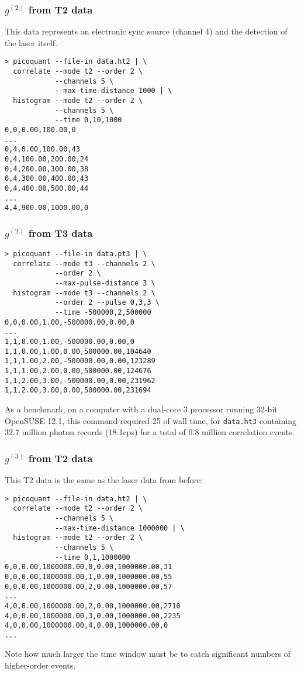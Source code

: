 \documentclass{article}
\newcommand{\cps}{\textnormal{cps}}
\newcommand{\gn}[1]{\ensuremath{g^{(#1)}}}
\begin{document}
\subsubsection{\gn{2} from T2 data}
This data represents an electronic sync source (channel 4) and the detection of the laser itself.
\begin{verbatim}
> picoquant --file-in data.ht2 | \
  correlate --mode t2 --order 2 \
            --channels 5 \
            --max-time-distance 1000 | \
  histogram --mode t2 --order 2 \
            --channels 5 \
            --time 0,10,1000
0,0,0.00,100.00,0
...
0,4,0.00,100.00,43
0,4,100.00,200.00,24
0,4,200.00,300.00,38
0,4,300.00,400.00,43
0,4,400.00,500.00,44
...
4,4,900.00,1000.00,0
\end{verbatim}

\subsubsection{\gn{2} from T3 data}
\begin{verbatim}
> picoquant --file-in data.pt3 | \
  correlate --mode t3 --channels 2 \
            --order 2 \
            --max-pulse-distance 3 \
  histogram --mode t3 --channels 2 \
            --order 2 --pulse 0,3,3 \
            --time -500000,2,500000
0,0,0.00,1.00,-500000.00,0.00,0
...
1,1,0.00,1.00,-500000.00,0.00,0
1,1,0.00,1.00,0.00,500000.00,104640
1,1,1.00,2.00,-500000.00,0.00,123289
1,1,1.00,2.00,0.00,500000.00,124676
1,1,2.00,3.00,-500000.00,0.00,231962
1,1,2.00,3.00,0.00,500000.00,231694
\end{verbatim}
As a benchmark, on a computer with a dual-core 3\giga\hertz{} processor running 32-bit OpenSUSE 12.1, this command required 25\second{} of wall time, for \texttt{data.ht3} containing 32.7 million photon records (18.1\kilo\cps) for a total of 0.8 million correlation events.

\subsubsection{\gn{3} from T2 data}
This T2 data is the same as the laser data from before:
\begin{verbatim}
> picoquant --file-in data.ht2 | \
  correlate --mode t2 --order 2 \
            --channels 5 \
            --max-time-distance 1000000 | \
  histogram --mode t2 --order 2 \
            --channels 5 \
            --time 0,1,1000000
0,0,0.00,1000000.00,0,0.00,1000000.00,31
0,0,0.00,1000000.00,1,0.00,1000000.00,55
0,0,0.00,1000000.00,2,0.00,1000000.00,57
...
4,0,0.00,1000000.00,2,0.00,1000000.00,2710
4,0,0.00,1000000.00,3,0.00,1000000.00,2235
4,0,0.00,1000000.00,4,0.00,1000000.00,0
...
\end{verbatim}
Note how much larger the time window must be to catch significant numbers of higher-order events.
\end{document}
